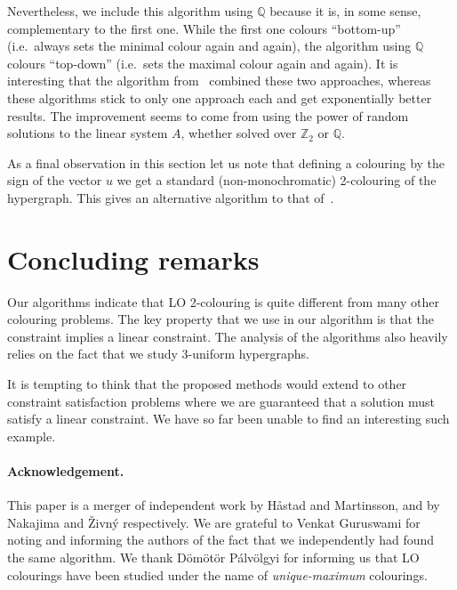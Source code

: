 \documentclass[a4paper,11pt]{article}
\theoremstyle{plain}
\theoremstyle{definition}
\begin{document}
Nevertheless, we include this algorithm using $\mathbb{Q}$ because it is, in some sense, complementary to the first one. While the first one colours ``bottom-up'' (i.e.~always sets the minimal colour again and again), the algorithm using $\mathbb{Q}$ colours ``top-down'' (i.e.~sets the maximal colour again and again). It is interesting that the algorithm from~\cite{NZ23:toct} combined these two approaches, whereas these algorithms stick to only one approach each and get exponentially better results. The improvement seems to come from using the power of random solutions to the linear system $A$, whether solved over $\mathbb{Z}_2$ or $\mathbb{Q}$.

As a final observation in this section let us note that defining
a colouring by the sign of the vector $u$ we get a standard
(non-monochromatic) 2-colouring of the hypergraph.  This gives an alternative
algorithm to that of~\cite{BG21:sicomp,BG19}.

\section{Concluding remarks}

Our algorithms indicate that LO 2-colouring is quite different
from many other colouring problems.  The key property that we
use in our algorithm is that the constraint implies a linear
constraint.   The analysis of the algorithms also heavily
relies on the fact that we study 3-uniform hypergraphs.

It is tempting to think that the proposed methods would extend to
other constraint satisfaction problems where we are guaranteed
that a solution must satisfy a linear constraint.  We have so far been
unable to find an interesting such example.



\paragraph{Acknowledgement.} This paper is a merger of independent work by H{\aa}stad and Martinsson, and by Nakajima and {\v{Z}}ivn{\'{y}} respectively.
We are grateful to Venkat Guruswami for noting and informing the authors of the fact that we independently had found the same algorithm.
We thank  D\"om\"ot\"or P\'alv\"olgyi
for informing us that LO colourings have been studied under the name of \emph{unique-maximum} colourings.



{\small


}
\end{document}
